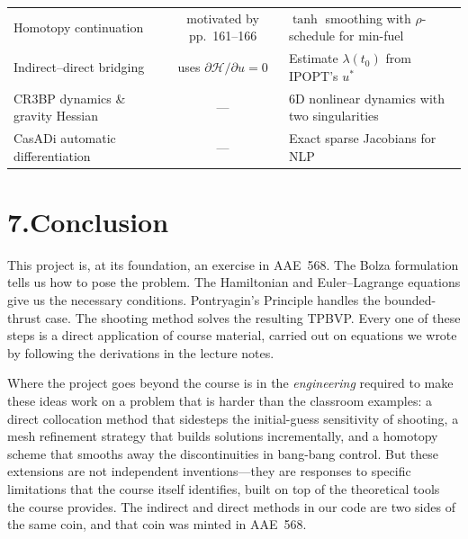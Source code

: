\documentclass[11pt,letterpaper]{article}
\begin{document}
\begin{center}
\begin{tabularx}{\textwidth}{>{\raggedright\arraybackslash}X c >{\raggedright\arraybackslash}p{5.5cm}}
Homotopy continuation               & motivated by pp.~161--166
                                                    & $\tanh$ smoothing with $\rho$-schedule for min-fuel \\
Indirect--direct bridging           & uses $\partial\mathcal{H}/\partial u = 0$
                                                    & Estimate $\lambda(t_0)$ from IPOPT's $u^*$ \\
CR3BP dynamics \& gravity Hessian    & ---           & 6D nonlinear dynamics with two singularities \\
CasADi automatic differentiation    & ---           & Exact sparse Jacobians for NLP \\
\bottomrule
\end{tabularx}
\end{center}


\section{7.\quad Conclusion}

This project is, at its foundation, an exercise in AAE~568. The Bolza formulation tells us how to pose the problem. The Hamiltonian and Euler--Lagrange equations give us the necessary conditions. Pontryagin's Principle handles the bounded-thrust case. The shooting method solves the resulting TPBVP. Every one of these steps is a direct application of course material, carried out on equations we wrote by following the derivations in the lecture notes.

Where the project goes beyond the course is in the \emph{engineering} required to make these ideas work on a problem that is harder than the classroom examples: a direct collocation method that sidesteps the initial-guess sensitivity of shooting, a mesh refinement strategy that builds solutions incrementally, and a homotopy scheme that smooths away the discontinuities in bang-bang control. But these extensions are not independent inventions---they are responses to specific limitations that the course itself identifies, built on top of the theoretical tools the course provides. The indirect and direct methods in our code are two sides of the same coin, and that coin was minted in AAE~568.
\end{document}
